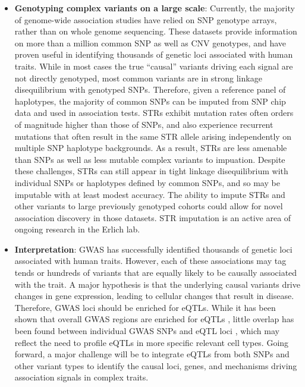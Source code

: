 \begin{itemize}
\item \textbf{Genotyping complex variants on a large scale}: Currently, the majority of genome-wide association studies have relied on SNP genotype arrays, rather than on whole genome sequencing. These datasets provide information on more than a million common SNP as well as CNV genotypes, and have proven useful in identifying thousands of genetic loci associated with human traits. While in most cases the true ``causal'' variants driving each signal are not directly genotyped, most common variants are in strong linkage disequilibrium with genotyped SNPs. Therefore, given a reference panel of haplotypes, the majority of common SNPs can be imputed from SNP chip data and used in association tests. STRs exhibit mutation rates often orders of magnitude higher than those of SNPs, and also experience recurrent mutations that often result in the same STR allele arising independently on multiple SNP haplotype backgrounds. As a result, STRs are less amenable than SNPs as well as less mutable complex variants to impuation. 
Despite these challenges, STRs can still appear in tight linkage disequilibrium with individual SNPs or haplotypes defined by common SNPs, and so may be imputable with at least modest accuracy. The ability to impute STRs and other variants to large previously genotyped cohorts could allow for novel association discovery in those datasets. STR imputation is an active area of ongoing research in the Erlich lab.

\item \textbf{Interpretation}: GWAS has successfully identified thousands of genetic loci associated with human traits. However, each of these associations may tag tends or hundreds of variants that are equally likely to be causally associated with the trait. A major hypothesis is that the underlying causal variants drive changes in gene expression, leading to cellular changes that result in disease. Therefore, GWAS loci should be enriched for eQTLs. While it has been shown that overall GWAS regions are enriched for eQTLs \cite{NicolaeGamazonZhangEtAl2010}, little overlap has been found between individual GWAS SNPs and eQTL loci \cite{HuangFangJostinsEtAl2015}, which may reflect the need to profile eQTLs in more specific relevant cell types. Going forward, a major challenge will be to integrate eQTLs from both SNPs and other variant types to identify the causal loci, genes, and mechanisms driving association signals in complex traits.

\end{itemize}

